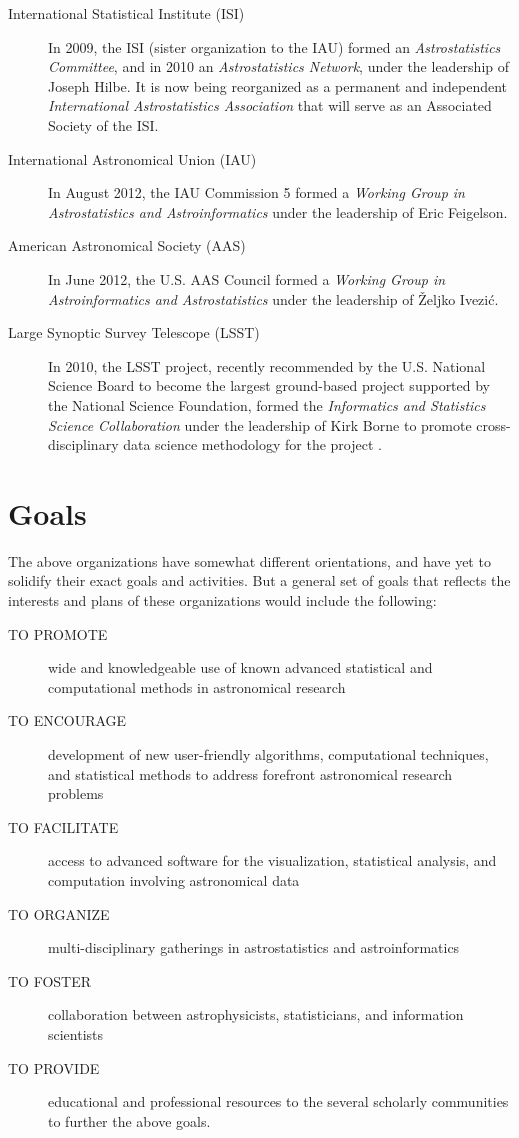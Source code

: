 \begin{description}

\item[International Statistical Institute (ISI)]  In 2009, the ISI (sister organization to the IAU) formed an {\it Astrostatistics Committee}, and in 2010 an {\it Astrostatistics Network}, under the leadership of Joseph Hilbe. It is now being reorganized as a permanent and independent {\it International Astrostatistics Association} that will serve as an Associated Society of the ISI. 

\item[International Astronomical Union (IAU)]  In August 2012, the IAU Commission 5 formed a {\it Working Group in Astrostatistics and Astroinformatics} under the leadership of Eric Feigelson.

\item[American Astronomical Society (AAS)]  In June 2012, the U.S. AAS Council formed a {\it Working Group in Astroinformatics and Astrostatistics} under the leadership of \v{Z}eljko Ivezi\'c.

\item[Large Synoptic Survey Telescope (LSST)] In 2010, the LSST project, recently recommended by the U.S. National Science Board to become the largest ground-based project supported by the National Science Foundation,   formed the {\it Informatics and Statistics Science Collaboration}  under the leadership of Kirk Borne to promote cross-disciplinary data science methodology for the project \citep{borne2010}.  

\end{description}

\section{Goals}

The above organizations have somewhat different orientations, and have yet to solidify their exact goals and activities.  But a general set of goals that reflects the interests and plans of these organizations would include the following:

\begin{description}
\item[TO PROMOTE] wide and knowledgeable use of known advanced statistical and  computational methods in astronomical research
\item[TO ENCOURAGE] development of new user-friendly algorithms, computational techniques, and statistical methods to address forefront astronomical research  problems
\item[TO FACILITATE] access to advanced software for the visualization, statistical  analysis, and computation involving astronomical data
\item[TO ORGANIZE] multi-disciplinary gatherings in astrostatistics and  astroinformatics
\item[TO FOSTER] collaboration between astrophysicists, statisticians, and information scientists
\item[TO PROVIDE] educational and professional resources to the several scholarly  communities to further the above goals.
\end{description}

